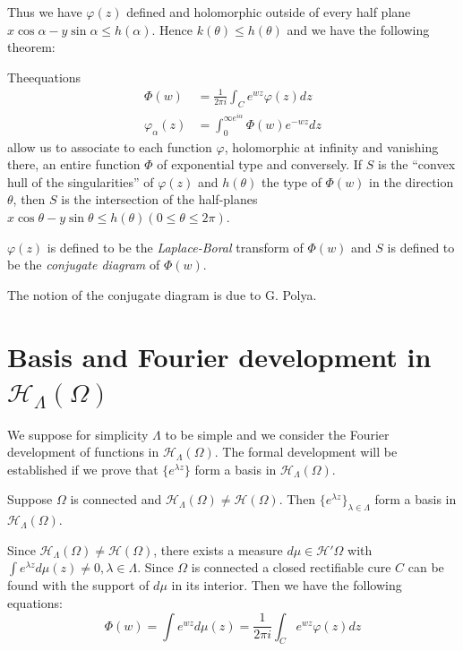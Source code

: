 Thus we have $\varphi (z)$ defined and holomorphic outside of every
half plane $x \cos \alpha - y \sin \alpha \le h (\alpha)$. Hence $k
(\theta) \le h (\theta)$ and we have the following theorem: 
\begin{theorem*}%
 The\pageoriginale equations
 \begin{align*}
   \Phi (w) &= \frac{1}{2 \pi i} \int_C e^{wz} \varphi (z) dz \tag{1}\\
   \varphi_\alpha (z) & = \int_0^{\infty e^{i \alpha}} \Phi (w) e^{-wz }dz \tag{2}
 \end{align*}
 allow us to associate to each function $\varphi$, holomorphic at
  infinity and vanishing there, an entire function $\Phi$ of
  exponential type and conversely. If $S$ is the ``convex hull of
  the singularities'' of $\varphi (z)$ and $h (\theta)$ the type of
  $\Phi (w)$ in the direction $\theta$, then $S$ is the
  intersection of the half-planes $x \cos \theta - y \sin \theta
  \le h (\theta) (0 \le \theta \le 2 \pi )$. 
\end{theorem*}

\begin{defi*}%
 $\varphi(z)$ is defined to be the {\em Laplace-Boral} transform of
 $\Phi (w)$ and $S$ is defined to be the {\em conjugate diagram } of
 $\Phi (w)$. 
\end{defi*}

The notion of the conjugate diagram is due to G. Polya.

\section{Basis and Fourier development in \texorpdfstring{$\mathscr{H}_\Lambda
  (\Omega)$}{mathscrH}}\label{chap9:sec2} %

We suppose for simplicity $\Lambda$ to be simple and we consider the
Fourier development of functions in $\mathscr{H}_\Lambda
(\Omega)$. The formal development will be established if we prove that
$\{e^{\lambda z}\}$ form a basis in $\mathscr{H}_\Lambda (\Omega)$. 

\setcounter{theorem}{0}
\begin{theorem}\label{chap9:sec2:thm1}%
  Suppose $\Omega$ is connected and $\mathscr{H}_\Lambda (\Omega) \neq
  \mathscr{H} (\Omega)$. Then $\{e^{\lambda z}\}_{\lambda \in
    \Lambda}$ form a basis in $\mathscr{H}_\Lambda (\Omega)$. 
\end{theorem}

Since $\mathscr{H}_\Lambda (\Omega) \neq \mathscr{H}(\Omega)$, there
exists a measure $d \mu \in \mathscr{H}' \Omega$ with $\int e^{\lambda
 z} d \mu (z) \neq 0, \lambda \in \Lambda$. Since $\Omega$ is
connected a closed rectifiable cure $C$ can be found with the support
of $d \mu$ in its interior. Then we have the following equations: 
$$
\Phi (w) = \int e^{wz} d \mu (z) = \frac{1}{ 2 \pi i} \int_C e^{wz}
\varphi (z) dz 
$$

